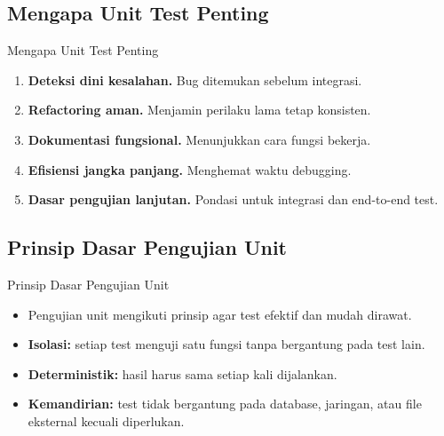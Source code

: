 \documentclass[aspectratio=169, table]{beamer}
\begin{document}
\subsection{Mengapa Unit Test Penting}
\begin{frame}[fragile]{Mengapa Unit Test Penting}
\vspace*{10pt}
\begin{enumerate}
  \item \textbf{Deteksi dini kesalahan.} Bug ditemukan sebelum integrasi.
  \item \textbf{Refactoring aman.} Menjamin perilaku lama tetap konsisten.
  \item \textbf{Dokumentasi fungsional.} Menunjukkan cara fungsi bekerja.
  \item \textbf{Efisiensi jangka panjang.} Menghemat waktu debugging.
  \item \textbf{Dasar pengujian lanjutan.} Pondasi untuk integrasi dan end-to-end test.
\end{enumerate}
\end{frame}

\subsection{Prinsip Dasar Pengujian Unit}

\begin{frame}[fragile]{Prinsip Dasar Pengujian Unit}
\vspace*{10pt}
\begin{itemize}
  \item Pengujian unit mengikuti prinsip agar test efektif dan mudah dirawat.
  \item \textbf{Isolasi:} setiap test menguji satu fungsi tanpa bergantung pada test lain.
  \item \textbf{Deterministik:} hasil harus sama setiap kali dijalankan.
  \item \textbf{Kemandirian:} test tidak bergantung pada database, jaringan, atau file eksternal kecuali diperlukan.
\end{itemize}
\end{frame}

\end{document}
